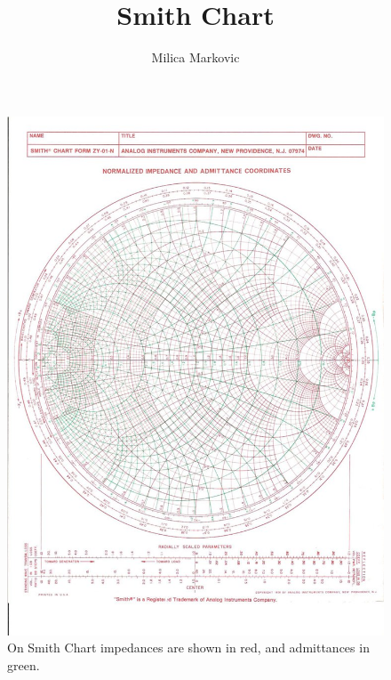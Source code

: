 \documentclass{ximera}
\title{Smith Chart}
\author{Milica Markovic}
\begin{document}
  
\begin{abstract}  

\end{abstract}  
\maketitle    








\begin{figure}[htbp]
\begin{center}
\includegraphics[scale=0.3]{../jpg/SCadmimp.jpg}
\end{center}
\caption{On Smith Chart impedances are shown in red, and admittances in green.}
\label{scadmimp}
\end{figure}
\end{document}
